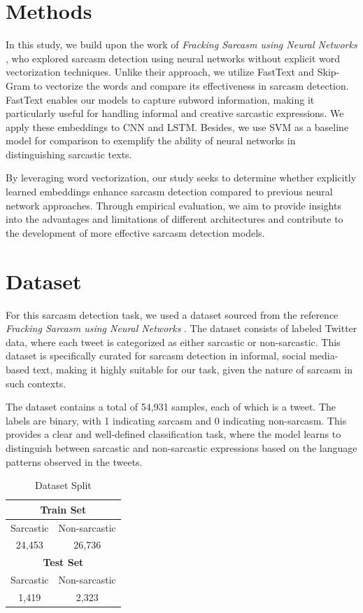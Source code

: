 \documentclass[11pt]{article}
\begin{document}
\section{Methods}
In this study, we build upon the work of \emph{Fracking Sarcasm using Neural Networks} \cite{ghosh2016magnets}, who explored sarcasm detection using neural networks without explicit word vectorization techniques. Unlike their approach, we utilize FastText and Skip-Gram to vectorize the words and compare its effectiveness in sarcasm detection. FastText enables our models to capture subword information, making it particularly useful for handling informal and creative sarcastic expressions. We apply these embeddings to CNN and LSTM. Besides, we use SVM as a baseline model for comparison to exemplify the ability of neural networks in distinguishing sarcastic texts.

By leveraging word vectorization, our study seeks to determine whether explicitly learned embeddings enhance sarcasm detection compared to previous neural network approaches. Through empirical evaluation, we aim to provide insights into the advantages and limitations of different architectures and contribute to the development of more effective sarcasm detection models.

\section{Dataset}
For this sarcasm detection task, we used a dataset sourced from the reference \emph{Fracking Sarcasm using Neural Networks} \cite{ghosh2016magnets}. The dataset consists of labeled Twitter data, where each tweet is categorized as either sarcastic or non-sarcastic. This dataset is specifically curated for sarcasm detection in informal, social media-based text, making it highly suitable for our task, given the nature of sarcasm in such contexts.

The dataset contains a total of 54,931 samples, each of which is a tweet. The labels are binary, with 1 indicating sarcasm and 0 indicating non-sarcasm. This provides a clear and well-defined classification task, where the model learns to distinguish between sarcastic and non-sarcastic expressions based on the language patterns observed in the tweets.

\begin{table}[ht]
\centering
\begin{tabular}{|c|c|}
\hline
\multicolumn{2}{|c|}{\textbf{Train Set}} \\ \hline
Sarcastic & Non-sarcastic \\ \hline
24,453 & 26,736 \\ \hline
\multicolumn{2}{|c|}{\textbf{Test Set}} \\ \hline
Sarcastic & Non-sarcastic \\ \hline
1,419 & 2,323 \\ \hline
\end{tabular}
\caption{Dataset Split}
\end{table}
\end{document}
